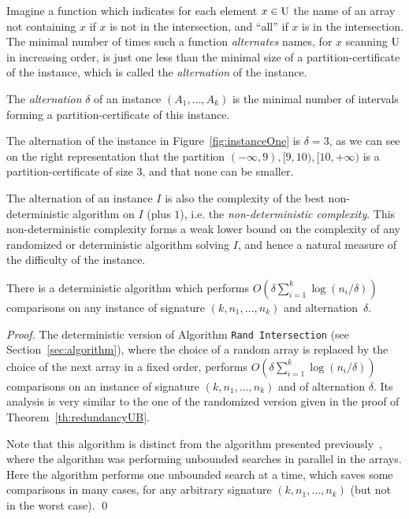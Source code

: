 Imagine a function which indicates for each element $x\in\rm U$ the
name of an array not containing $x$ if $x$ is not in the intersection,
and ``all'' if $x$ is in the intersection.
%
The minimal number of times such a function {\em alternates} names,
for $x$ scanning $\rm U$ in increasing order, is just one less than
the minimal size of a partition-certificate of the instance, which is
called the {\em alternation} of the instance.
%
\begin{definition}\label{def:alternation}
The {\em alternation} $\delta$ of an instance
$(A_1,\ldots,A_k)$ is the minimal number of intervals forming a
partition-certificate of this instance.
\end{definition}
\begin{example}
The alternation of the instance in Figure~\ref{fig:instanceOne} is
$\delta{=}3$, as we can see on the right representation that the
partition $(-\infty,9),[9,10),[10,+\infty)$ is a partition-certificate
of size $3$, and that none can be smaller.
\end{example}

The alternation of an instance $I$ is also the complexity of the best
non-deterministic algorithm on $I$ (plus $1$), i.e. the {\em
non-deterministic complexity}.
%
This non-deterministic complexity forms a weak lower bound on the
complexity of any randomized or deterministic algorithm solving $I$,
and hence a natural measure of the difficulty of the instance.

\begin{theorem}\label{th:alternationUB} 
There is a deterministic algorithm which performs
$O(\delta\sum_{i=1}^k\log(n_i/\delta))$ comparisons on any instance of
signature $(k,n_1,\ldots,n_k)$ and alternation~$\delta$.
\end{theorem}
\begin{proof}
The deterministic version of Algorithm {\tt Rand Intersection} (see
Section~\ref{sec:algorithm}), where the choice of a random array is
replaced by the choice of the next array in a fixed order, performs
$O(\delta\sum_{i=1}^k\log(n_i/\delta))$ comparisons on an instance of
signature $(k,n_1,\ldots,n_k)$ and of alternation $\delta$.
%
Its analysis is very similar to the one of the randomized version
given in the proof of Theorem~\ref{th:redundancyUB}.

Note that this algorithm is distinct from the algorithm presented
previously~\cite{adaptiveIntersectionAndTThresholdProblems}, where the algorithm was performing
unbounded searches in parallel in the arrays. 
%
Here the algorithm performs one unbounded search at a time, which
saves some comparisons in  many cases,
for any arbitrary signature $(k,n_1,\ldots,n_k)$ (but not
in the worst case).  \qed \end{proof}

